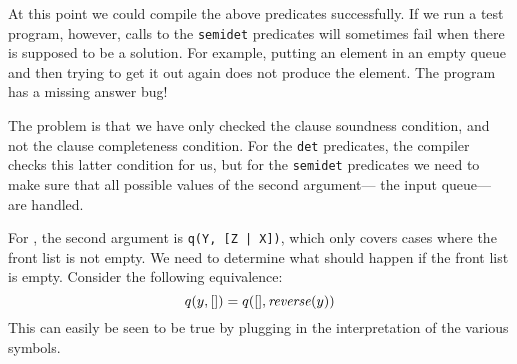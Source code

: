 At this point we could compile the above predicates successfully.
If we run a test program, however,
calls to the \texttt{semidet} predicates
will sometimes fail when there is supposed to be a solution.
For example,
putting an element in an empty queue
and then trying to get it out again
does not produce the element.
The program has a missing answer bug!

The problem is that we have only checked
the clause soundness condition,
and not the clause completeness condition.
For the \texttt{det} predicates,
the compiler checks this latter condition for us,
but for the \texttt{semidet} predicates
we need to make sure that
all possible values of the second argument---%
the input queue---%
are handled.

For , the second argument is \texttt{q(Y, [Z | X])},
which only covers cases where the front list is not empty.
We need to determine what should happen if the front list is empty.
Consider the following equivalence:
\[
    q(y, []) = q([], \text{\textit{reverse}}(y))
\]
This can easily be seen to be true
by plugging in the interpretation of the various symbols.

